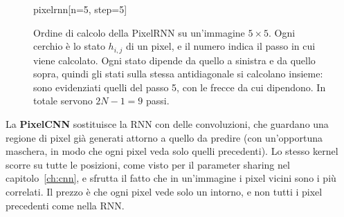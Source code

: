 \begin{figure}[htbp]
\centering
\begin{widget}{pixelrnn}[n=5, step=5]
\end{widget}
\caption{Ordine di calcolo della PixelRNN su un'immagine $5 \times 5$. Ogni cerchio è lo stato $h_{i,j}$ di un pixel, e il numero indica il passo in cui viene calcolato. Ogni stato dipende da quello a sinistra e da quello sopra, quindi gli stati sulla stessa antidiagonale si calcolano insieme: sono evidenziati quelli del passo 5, con le frecce da cui dipendono. In totale servono $2N - 1 = 9$ passi.}
\label{fig:pixelrnn}
\end{figure}

La \textbf{PixelCNN} \cite{vandenOord2016-PixelCNN} sostituisce la RNN con delle convoluzioni, che guardano una regione di pixel già generati attorno a quello da predire (con un'opportuna maschera, in modo che ogni pixel veda solo quelli precedenti). Lo stesso kernel scorre su tutte le posizioni, come visto per il parameter sharing nel capitolo~\ref{ch:cnn}, e sfrutta il fatto che in un'immagine i pixel vicini sono i più correlati. Il prezzo è che ogni pixel vede solo un intorno, e non tutti i pixel precedenti come nella RNN.

